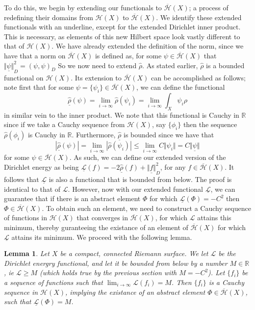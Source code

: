 \documentclass[11pt]{report}
\newtheorem{lemma}[thm]{Lemma}
\theoremstyle{definition}
\begin{document}
To do this, we begin by extending our functionals to $\overline{\mathcal{H}}(X)$; a process of redefining their domains from $\mathcal{H}(X)$ to $\overline{\mathcal{H}}(X)$. We identify these extended functionals with an underline, except for the extended Dirichlet inner product. This is necessary, as elements of this new Hilbert space look vastly different to that of $\mathcal{H}(X)$. We have already extended the definition of the norm, since we have that a norm on $\overline{\mathcal{H}}(X)$ is defined as, for some $\psi \in \overline{\mathcal{H}}(X)$ that $\underline{\Vert\psi\Vert}_D^2 = (\psi, \psi)_D$
So we now need to extend $\hat{\rho}$. As stated earlier, $\hat{\rho}$ is a bounded functional on $\mathcal{H}(X)$. Its extension to $\overline{\mathcal{H}}(X)$ can be accomplished as follows; note first that for some $\psi = \{\psi_i\} \in \overline{\mathcal{H}}(X)$, we can define the functional 
\[\underline{\hat{\rho}}(\psi) = \lim_{i \rightarrow \infty} \hat{\rho}(\psi_i) = \lim_{i \rightarrow \infty} \int_X \psi_i\rho\]
in similar vein to the inner product. We note that this functional is Cauchy in $\mathbb{R}$ since if we take a Cauchy sequence from $\mathcal{H}(X)$, say $\{\phi_i\}$ then the sequence $\hat{\rho}(\phi_i)$ is Cauchy in $\mathbb{R}$.
Furthermore, $\underline{\hat{\rho}}$ is bounded since we have that 
\[ |\underline{\hat{\rho}}(\psi)| = \lim_{i \rightarrow \infty}|\hat{\rho}(\psi_i)| \leq \lim_{i \rightarrow \infty}C\Vert \psi_i \Vert = C\underline{\Vert \psi\Vert} \] for some $\psi \in \overline{\mathcal{H}}(X)$.
As such, we can define our extended version of the Dirichlet energy as being
$\underline{\mathcal{L}}(f) =  -2\underline{\hat{\rho}}(f) + \underline{\Vert f \Vert}_D^2$, for any $f \in \overline{\mathcal{H}}(X)$. It follows that $\underline{\mathcal{L}}$ is also a functional that is bounded from below. The proof is identical to that of $\mathcal{L}$. However, now with our extended functional $\underline{\mathcal{L}}$, we can guarantee that if there is an abstract element $\Phi$ for which $\underline{\mathcal{L}}(\Phi) = -C^2$ then $\Phi \in \overline{\mathcal{H}}(X)$. To obtain such an element, we need to construct a Cauchy sequence of functions in $\mathcal{H}(X)$ that converges in $\overline{\mathcal{H}}(X)$, for which $\mathcal{L}$ attains this minimum, thereby guranteeing the existance of an element of $\overline{\mathcal{H}}(X)$ for which $\underline{\mathcal{L}}$ attains its minimum. We proceed with the following lemma.
\begin{lemma}
  Let $X$ be a compact, connected Riemann surface. We let $\mathcal{L}$ be the Dirichlet energry functional, and let it be bounded from below by a number $M \in \mathbb{R}$, ie $\mathcal{L} \geq M$ (which holds true by the previous section with $M=-C^2$).
  Let $\{f_i\}$ be a sequence of functions such that $\lim_{i \rightarrow \infty}\mathcal{L}(f_i) = M$. Then $\{f_i\}$ is a Cauchy sequence in $\mathcal{H}(X)$, implying the existance of an abstract element $\Phi \in \overline{\mathcal{H}}(X)$, such that $\underline{\mathcal{L}}(\Phi) = M$.
\end{lemma}
\end{document}
